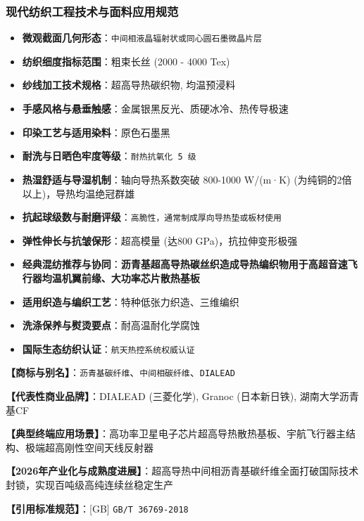 \documentclass[11pt,openright,twoside,UTF8]{ctexbook}
\begin{document}
\subsubsection*{现代纺织工程技术与面料应用规范}
\begin{itemize} \setlength{\itemsep}{2pt}
    \item \textbf{微观截面几何形态}：\texttt{中间相液晶辐射状或同心圆石墨微晶片层}
    \item \textbf{纺织细度指标范围}：粗束长丝 (2000 - 4000 Tex)
    \item \textbf{纱线加工技术规格}：超高导热碳织物, 均温预浸料
    \item \textbf{手感风格与悬垂触感}：金属银黑反光、质硬冰冷、热传导极速
    \item \textbf{印染工艺与适用染料}：原色石墨黑
    \item \textbf{耐洗与日晒色牢度等级}：\texttt{耐热抗氧化 5 级}
    \item \textbf{热湿舒适与导湿机制}：轴向导热系数突破 800-1000 W/(m·K) (为纯铜的2倍以上)，导热均温绝冠群雄
    \item \textbf{抗起球级数与耐磨评级}：\texttt{高脆性，通常制成厚向导热垫或板材使用}
    \item \textbf{弹性伸长与抗皱保形}：超高模量 (达800 GPa)，抗拉伸变形极强
    \item \textbf{经典混纺推荐与协同}：\textbf{沥青基超高导热碳丝织造成导热编织物用于高超音速飞行器均温机翼前缘、大功率芯片散热基板}
    \item \textbf{适用织造与编织工艺}：特种低张力织造、三维编织
    \item \textbf{洗涤保养与熨烫要点}：耐高温耐化学腐蚀
    \item \textbf{国际生态纺织认证}：\texttt{航天热控系统权威认证}
\end{itemize}
\vspace{0.2cm}

\noindent\textbf{【商标与别名】}：\texttt{沥青基碳纤维}、\texttt{中间相碳纤维}、\texttt{DIALEAD}\par
\noindent\textbf{【代表性商业品牌】}：DIALEAD (三菱化学), Granoc (日本新日铁), 湖南大学沥青基CF\par
\noindent\textbf{【典型终端应用场景】}：高功率卫星电子芯片超高导热散热基板、宇航飞行器主结构、极端超高刚性空间天线反射器\par
\noindent\textbf{【2026年产业化与成熟度进展】}：超高导热中间相沥青基碳纤维全面打破国际技术封锁，实现百吨级高纯连续丝稳定生产\par
\noindent\textbf{【引用标准规范】}：[GB] \texttt{GB/T 36769-2018}\par
\vspace{0.5cm}
\end{document}

